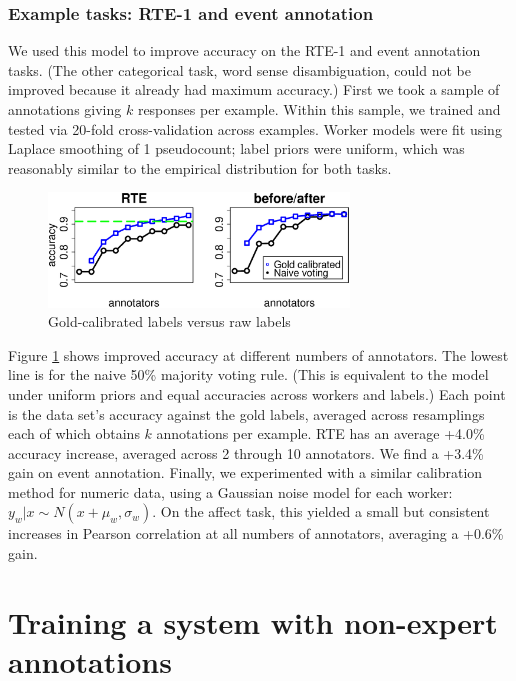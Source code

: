 \documentclass[11pt]{article}
\begin{document}
\subsubsection{ Example tasks: RTE-1 and event annotation }

We used this model to improve accuracy on the RTE-1 and event annotation tasks.  (The other categorical task, word sense disambiguation, could not be improved because it already had maximum accuracy.)  First we took a sample of annotations giving $k$ responses per example.  Within this sample, we trained and tested via 20-fold cross-validation across examples.  Worker models were fit using Laplace smoothing of 1 pseudocount; label priors were uniform, which was reasonably similar to the empirical distribution for both tasks.

\begin{figure}[ht]
\centering
\includegraphics[width=8cm]{figures/goldcalib.eps}
\caption{Gold-calibrated labels versus raw labels} \label{WorkerModelResults}
\end{figure}

Figure \ref{WorkerModelResults} shows improved accuracy at different numbers of annotators.  The lowest line is for the naive 50\% majority voting rule.  (This is equivalent to the model under uniform priors and equal accuracies across workers and labels.)  Each point is the data set's accuracy against the gold labels, averaged across resamplings each of which obtains $k$ annotations per example.  RTE has an average +4.0\% accuracy increase, averaged across 2 through 10 annotators.  We find a +3.4\% gain on event annotation.
Finally, we experimented with a similar calibration method for numeric data, using a Gaussian noise model for each worker: $y_w | x \sim N(x + \mu_w, \sigma_w)$.  On the affect task, this yielded a small but consistent increases in Pearson correlation at all numbers of annotators, averaging a +0.6\% gain.

\section{ Training a system with non-expert annotations }
\end{document}
